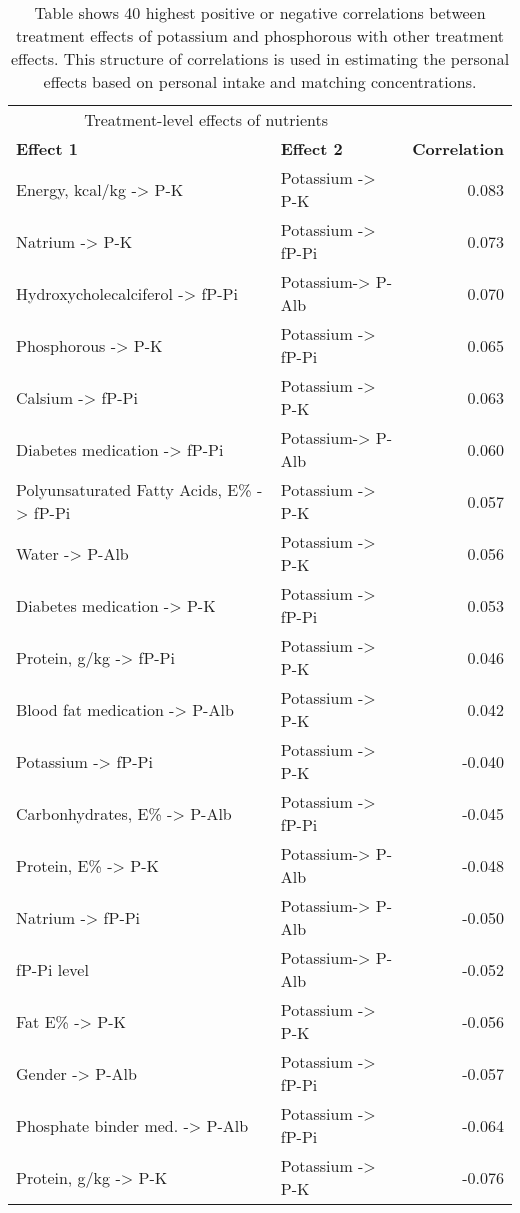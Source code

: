\documentclass[border=1mm, preview]{standalone}
\begin{document}
\begin{table}[H]

\caption{Table shows 40 highest positive or negative correlations between treatment effects of potassium and phosphorous with other treatment effects. This structure of correlations is used in estimating the personal effects based on personal intake and matching concentrations.}
\centering
\begin{tabular}[t]{llr}
\toprule
\multicolumn{2}{c}{Treatment-level effects of nutrients} & \multicolumn{1}{c}{ } \\
\cmidrule(l{3pt}r{3pt}){1-2}
\textbf{Effect 1} & \textbf{Effect 2} & \textbf{Correlation}\\
\midrule
Energy, kcal/kg -> P-K & Potassium -> P-K & 0.083\\
Natrium -> P-K & Potassium -> fP-Pi & 0.073\\
Hydroxycholecalciferol -> fP-Pi & Potassium-> P-Alb & 0.070\\
Phosphorous -> P-K & Potassium -> fP-Pi & 0.065\\
Calsium -> fP-Pi & Potassium -> P-K & 0.063\\
\addlinespace
Diabetes medication -> fP-Pi & Potassium-> P-Alb & 0.060\\
Polyunsaturated Fatty Acids, E\% -> fP-Pi & Potassium -> P-K & 0.057\\
Water -> P-Alb & Potassium -> P-K & 0.056\\
Diabetes medication -> P-K & Potassium -> fP-Pi & 0.053\\
Protein, g/kg -> fP-Pi & Potassium -> P-K & 0.046\\
\addlinespace
Blood fat medication -> P-Alb & Potassium -> P-K & 0.042\\
Potassium -> fP-Pi & Potassium -> P-K & -0.040\\
Carbonhydrates, E\% -> P-Alb & Potassium -> fP-Pi & -0.045\\
Protein, E\% -> P-K & Potassium-> P-Alb & -0.048\\
Natrium -> fP-Pi & Potassium-> P-Alb & -0.050\\
\addlinespace
fP-Pi level & Potassium-> P-Alb & -0.052\\
Fat E\% -> P-K & Potassium -> P-K & -0.056\\
Gender -> P-Alb & Potassium -> fP-Pi & -0.057\\
Phosphate binder med. -> P-Alb & Potassium -> fP-Pi & -0.064\\
Protein, g/kg -> P-K & Potassium -> P-K & -0.076\\

\end{tabular}
\end{table}
\end{document}
